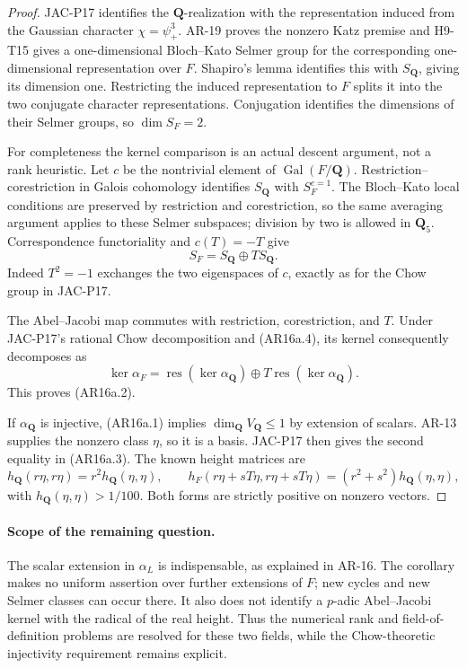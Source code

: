 \documentclass[11pt,a4paper]{article}
\begin{document}
\begin{proof}
JAC-P17 identifies the \(\mathbf Q\)-realization with the
representation induced from the Gaussian character
\(\chi=\psi_+^3\). AR-19 proves the nonzero Katz premise and
H9-T15 gives a one-dimensional Bloch--Kato Selmer group for the
corresponding one-dimensional representation over \(F\).
Shapiro's lemma identifies this with \(S_{\mathbf Q}\), giving
its dimension one. Restricting the induced representation to
\(F\) splits it into the two conjugate character representations.
Conjugation identifies the dimensions of their Selmer groups,
so \(\dim S_F=2\).

For completeness the kernel comparison is an actual descent
argument, not a rank heuristic. Let \(c\) be the nontrivial
element of \(\operatorname{Gal}(F/\mathbf Q)\).
Restriction--corestriction in Galois cohomology identifies
\(S_{\mathbf Q}\) with \(S_F^{c=1}\).
The Bloch--Kato local conditions are preserved by restriction
and corestriction, so the same averaging argument applies to
these Selmer subspaces; division by two is allowed in
\(\mathbf Q_5\). Correspondence functoriality and
\(c(T)=-T\) give
\[
                S_F=S_{\mathbf Q}\oplus T S_{\mathbf Q}.
                                                               \tag{AR16a.4}
\]
Indeed \(T^2=-1\) exchanges the two eigenspaces of \(c\),
exactly as for the Chow group in JAC-P17.

The Abel--Jacobi map commutes with restriction, corestriction,
and \(T\). Under JAC-P17's rational Chow decomposition and
(AR16a.4), its kernel consequently decomposes as
\[
 \ker\alpha_F=
       \operatorname{res}(\ker\alpha_{\mathbf Q})
          \oplus T\operatorname{res}(\ker\alpha_{\mathbf Q}).
                                                               \tag{AR16a.5}
\]
This proves (AR16a.2).

If \(\alpha_{\mathbf Q}\) is injective, (AR16a.1) implies
\(\dim_{\mathbf Q}V_{\mathbf Q}\le1\) by extension of scalars.
AR-13 supplies the nonzero class \(\eta\), so it is a basis.
JAC-P17 then gives the second equality in (AR16a.3).
The known height matrices are
\[
 h_{\mathbf Q}(r\eta,r\eta)=r^2h_{\mathbf Q}(\eta,\eta),
 \qquad
 h_F(r\eta+sT\eta,r\eta+sT\eta)
       =(r^2+s^2)h_{\mathbf Q}(\eta,\eta),
\]
with \(h_{\mathbf Q}(\eta,\eta)>1/100\).
Both forms are strictly positive on nonzero vectors.
\end{proof}

\paragraph{Scope of the remaining question.}
The scalar extension in \(\alpha_L\) is indispensable, as
explained in AR-16. The corollary makes no uniform assertion
over further extensions of \(F\); new cycles and new Selmer
classes can occur there. It also does not identify a
\(p\)-adic Abel--Jacobi kernel with the radical of the real
height. Thus the numerical rank and field-of-definition
problems are resolved for these two fields, while the
Chow-theoretic injectivity requirement remains explicit.
\end{document}
